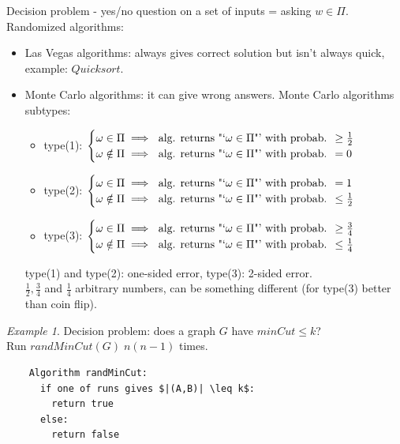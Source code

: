 \documentclass[a4paper, 12pt]{book}
\theoremstyle{definition}
\theoremstyle{remark}
\newtheorem*{ex}{Example}
\begin{document}
Decision problem - yes/no question on a set of inputs = asking $w \in \Pi$. \\
Randomized algorithms:
\begin{itemize}
  \item Las Vegas algorithms: always gives correct solution but isn't always quick, example: $Quicksort$.
  \item Monte Carlo algorithms: it can give wrong answers.
    Monte Carlo algorithms subtypes:
    \begin{itemize}
      \item type(1): $\begin{cases}
          \omega \in \Pi \implies \text{ alg. returns "`$\omega \in \Pi$"' with probab. } \geq \frac{1}{2} \\ 
          \omega \notin \Pi \implies \text{ alg. returns "`$\omega \in \Pi$"' with probab. } = 0 
        \end{cases}$
      \item type(2): $\begin{cases}
          \omega \in \Pi \implies \text{ alg. returns "`$\omega \in \Pi$"' with probab. } = 1 \\ 
          \omega \notin \Pi \implies \text{ alg. returns "`$\omega \in \Pi$"' with probab. } \leq \frac{1}{2} 
        \end{cases}$
      \item type(3): $\begin{cases}
          \omega \in \Pi \implies \text{ alg. returns "`$\omega \in \Pi$"' with probab. } \geq \frac{3}{4} \\ 
          \omega \notin \Pi \implies \text{ alg. returns "`$\omega \in \Pi$"' with probab. } \leq \frac{1}{4}
        \end{cases}$
    \end{itemize}
    type(1) and type(2): one-sided error, type(3): 2-sided error. \\
    $\frac{1}{2}, \frac{3}{4}$ and $\frac{1}{4}$ arbitrary numbers, can be something different (for type(3) better than coin flip).
\end{itemize}
\begin{ex}
  Decision problem: does a graph $G$ have $minCut \leq k$? \\
  Run $randMinCut(G) \; n(n-1)$ times.
  \begin{lstlisting}
    Algorithm randMinCut:
      if one of runs gives $|(A,B)| \leq k$:
        return true
      else:
        return false
  \end{lstlisting}
\end{ex}
\end{document}
